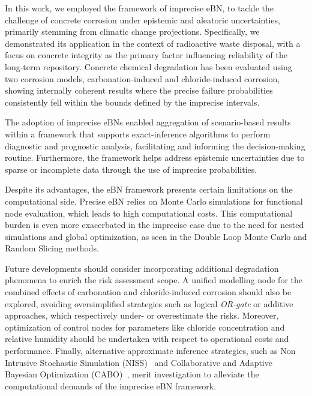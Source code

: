 In this work, we employed the framework of imprecise eBN, to tackle the challenge of concrete corrosion under epistemic and aleatoric uncertainties, primarily stemming from climatic change projections. 
Specifically, we demonstrated its application in the context of radioactive waste disposal, with a focus on concrete integrity as the primary factor influencing reliability of the long-term repository. 
Concrete chemical degradation has been evaluated using two corrosion models, carbonation-induced and chloride-induced corrosion, showing internally coherent results where the precise failure probabilities consistently fell within the bounds defined by the imprecise intervals.

The adoption of imprecise eBNs enabled aggregation of scenario-based results within a framework that supports exact-inference algorithms to perform diagnostic and prognostic analysis, facilitating and informing the decision-making routine. Furthermore, the framework helps address epistemic uncertainties due to sparse or incomplete data through the use of imprecise probabilities.

Despite its advantages, the eBN framework presents certain limitations on the computational side. Precise eBN relies on Monte Carlo simulations for functional node evaluation, which leads to high computational costs. This computational burden is even more exacerbated in the imprecise case due to the need for nested simulations and global optimization, as seen in the Double Loop Monte Carlo and Random Slicing methods.

Future developments should consider incorporating additional degradation phenomena to enrich the risk assessment scope. A unified modelling node for the combined effects of carbonation and chloride-induced corrosion should also be explored, avoiding oversimplified strategies such as logical \textit{OR-gate} or additive approaches, which respectively under- or overestimate the risks. Moreover, optimization of control nodes for parameters like chloride concentration and relative humidity should be undertaken with respect to operational costs and performance. Finally, alternative approximate inference strategies, such as Non Intrusive Stochastic Simulation (NISS)~\cite{wei_non-intrusive_2019} and Collaborative and Adaptive Bayesian Optimization (CABO)~\cite{hong_sequential_2024}, merit investigation to alleviate the computational demands of the imprecise eBN framework.
